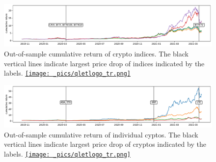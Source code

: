 
\begin{figure}[t]
\includegraphics[width=\textwidth]{_pics/index_price.pdf}
  \caption{Out-of-sample cumulative return of crypto indices.
  The black vertical lines indicate largest price drop of indices indicated by the labels.
  \href{http://www.quantlet.com/}{\texttt{[image: \_pics/qletlogo\_tr.png]}} }
\label{fig:index_price}
\end{figure}

\begin{figure}[!]
\includegraphics[width=\textwidth]{_pics/individualCoins_price.pdf}
  \caption{Out-of-sample cumulative return of individual cyptos.
  The black vertical lines indicate largest price drop of cryptos indicated by the labels.
  \href{http://www.quantlet.com/}{\texttt{[image: \_pics/qletlogo\_tr.png]}} }
\label{fig:individualCoins_price}
\end{figure}

